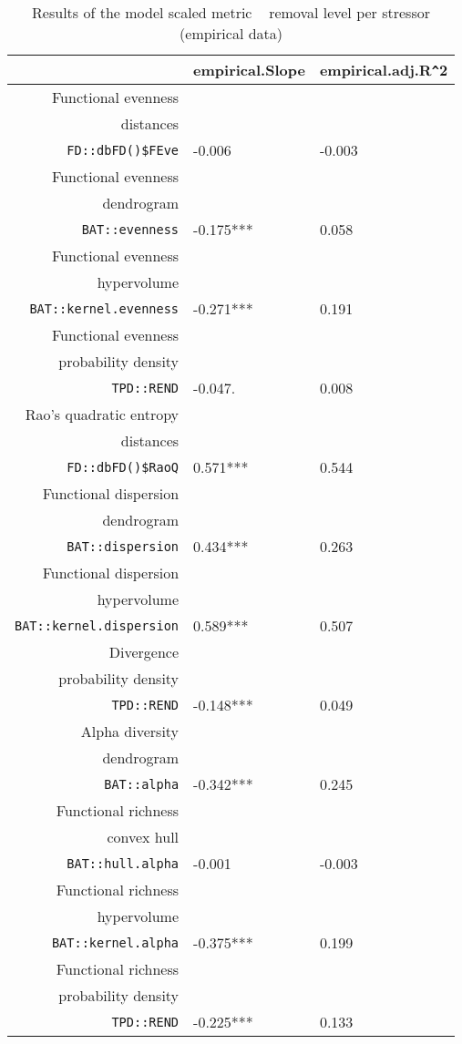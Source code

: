 \begin{table}[ht]
\scriptsize
\centering
\begin{tabular}{rll}
  \hline
 & empirical.Slope & empirical.adj.R\verb|^|2 \\ 
  \hline
Functional evenness\\distances\\\texttt{FD::dbFD()\$FEve} & -0.006 & -0.003 \\ 
  Functional evenness\\dendrogram\\\texttt{BAT::evenness} & -0.175*** & 0.058 \\ 
  Functional evenness\\hypervolume\\\texttt{BAT::kernel.evenness} & -0.271*** & 0.191 \\ 
  Functional evenness\\probability density\\\texttt{TPD::REND} & -0.047. & 0.008 \\ 
  Rao's quadratic entropy\\distances\\\texttt{FD::dbFD()\$RaoQ} & 0.571*** & 0.544 \\ 
  Functional dispersion\\dendrogram\\\texttt{BAT::dispersion} & 0.434*** & 0.263 \\ 
  Functional dispersion\\hypervolume\\\texttt{BAT::kernel.dispersion} & 0.589*** & 0.507 \\ 
  Divergence\\probability density\\\texttt{TPD::REND} & -0.148*** & 0.049 \\ 
  Alpha diversity\\dendrogram\\\texttt{BAT::alpha} & -0.342*** & 0.245 \\ 
  Functional richness\\convex hull\\\texttt{BAT::hull.alpha} & -0.001 & -0.003 \\ 
  Functional richness\\hypervolume\\\texttt{BAT::kernel.alpha} & -0.375*** & 0.199 \\ 
  Functional richness\\probability density\\\texttt{TPD::REND} & -0.225*** & 0.133 \\ 
   \hline
\end{tabular}
\caption{Results of the model scaled metric ~ removal level per stressor (empirical data)} 
\end{table}
